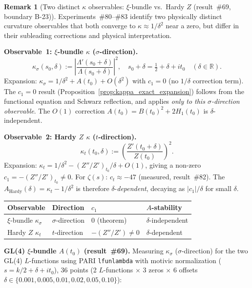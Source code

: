 \documentclass[11pt, a4paper]{article}
\theoremstyle{definition}
\newtheorem{remark}{Remark}[section]
\theoremstyle{plain}
\begin{document}
\begin{remark}[Two distinct $\kappa$ observables: $\xi$-bundle vs.\ Hardy $Z$ (result~\#69, boundary B-23)]
\label{rem:xi_bundle_b23}
Experiments~\#80--\#83 identify two physically distinct curvature observables
that both converge to $\kappa \approx 1/\delta^2$ near a zero, but differ in
their subleading corrections and physical interpretation.

\textbf{Observable~1: $\xi$-bundle $\kappa$ ($\sigma$-direction).}
\[
  \kappa_\sigma(s_0, \delta) := \left|\frac{\Lambda'(s_0+\delta)}{\Lambda(s_0+\delta)}\right|^2,
  \quad s_0 + \delta = \tfrac12 + \delta + it_0 \quad (\delta \in \mathbb{R}).
\]
Expansion: $\kappa_\sigma = 1/\delta^2 + A(t_0) + O(\delta^2)$ with
$c_1 = 0$ (no $1/\delta$ correction term).
The $c_1 = 0$ result (Proposition~\ref{prop:kappa_exact_expansion}) follows
from the functional equation and Schwarz reflection, and applies
\emph{only to this $\sigma$-direction observable}.
The $O(1)$ correction $A(t_0) = B(t_0)^2 + 2H_1(t_0)$ is $\delta$-independent.

\textbf{Observable~2: Hardy $Z$ $\kappa$ ($t$-direction).}
\[
  \kappa_t(t_0, \delta) := \left(\frac{Z'(t_0 + \delta)}{Z(t_0)}\right)^2.
\]
Expansion: $\kappa_t = 1/\delta^2 - (Z''/Z')_{t_0}/\delta + O(1)$, giving
a non-zero $c_1 = -(Z''/Z')_{t_0} \neq 0$.
For $\zeta(s)$: $c_t \approx -47$ (measured, result~\#82).
The $A_{\mathrm{Hardy}}(\delta) = \kappa_t - 1/\delta^2$ is therefore
$\delta$-\emph{dependent}, decaying as $|c_1|/\delta$ for small $\delta$.

\smallskip
\begin{center}
\small
\begin{tabular}{@{}llll@{}}
\toprule
Observable & Direction & $c_1$ & $A$-stability \\
\midrule
$\xi$-bundle $\kappa_\sigma$ & $\sigma$-direction & $0$ (theorem) & $\delta$-independent \\
Hardy $Z$ $\kappa_t$ & $t$-direction & $-(Z''/Z')\neq 0$ & $\delta$-dependent \\
\bottomrule
\end{tabular}
\end{center}
\smallskip

\textbf{GL(4) $\xi$-bundle $A(t_0)$ (result~\#69).}
Measuring $\kappa_\sigma$ ($\sigma$-direction) for the two GL(4) $L$-functions
using PARI \texttt{lfunlambda} with motivic normalization
($s = k/2 + \delta + it_0$), 36 points (2 $L$-functions $\times$ 3 zeros
$\times$ 6 offsets $\delta \in \{0.001, 0.005, 0.01, 0.02, 0.05, 0.10\}$):


\end{remark}
\end{document}
